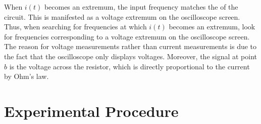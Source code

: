 \noindent When $i(t)$ becomes an extremum, the input frequency matches the  of the circuit. This is manifested as a voltage extremum on the oscilloscope screen. Thus, when searching for frequencies at which $i(t)$ becomes an extremum, look for frequencies corresponding to a voltage extremum on the oscilloscope screen. The reason for voltage measurements rather than current measurements is due to the fact that the oscilloscope only displays voltages. Moreover, the signal at point $b$ is the voltage across the resistor, which is directly proportional to the current by Ohm's law.

\section{Experimental Procedure}

